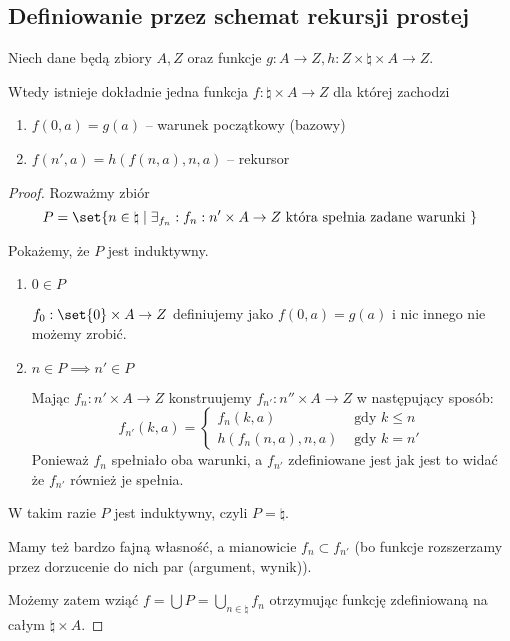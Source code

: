 \subsection{Definiowanie przez schemat rekursji prostej}

\begin{theorem}
Niech dane będą zbiory \( A, Z \) oraz funkcje \( g: A \rightarrow Z, h : Z \times \natural \times A \rightarrow Z \).

Wtedy istnieje dokładnie jedna funkcja \( f : \natural \times A \rightarrow Z \) dla której zachodzi
\begin{enumerate}
    \item \( f(0, a) = g(a) \) -- warunek początkowy (bazowy)
    \item \( f(n', a) = h(f(n, a), n, a) \) -- rekursor
\end{enumerate}
\end{theorem}
\begin{proof}
    Rozważmy zbiór 
    \[
        P = \set{ n \in \natural \mid \exists_{f_n} : f_n : n' \times A \rightarrow Z \text{ która spełnia zadane warunki }}
    \]
    
    Pokażemy, że \( P \) jest induktywny.
    
    \begin{enumerate}
        \item \( 0 \in P \)
            
            \( f_0 : \set{0} \times A \rightarrow Z \) definiujemy jako \( f(0, a) = g(a) \) i nic innego nie możemy zrobić.
            
        \item \( n \in P \implies n' \in P \)
        
            Mając \( f_n : n' \times A \rightarrow Z \) konstruujemy \( f_{n'} : n'' \times A \rightarrow Z \) w następujący sposób:
            \[
                f_{n'}(k, a) = \begin{cases}
                    f_n(k, a) & \text{ gdy } k \leq n \\
                    h(f_n(n, a), n, a) & \text{ gdy } k = n'
                \end{cases}
            \]
            Ponieważ \( f_n \) spełniało oba warunki, a \( f_{n'} \) zdefiniowane jest jak jest to widać że \( f_{n'} \) również je spełnia.
    \end{enumerate}
    
    W takim razie \( P \) jest induktywny, czyli \( P = \natural \). 
    
    Mamy też bardzo fajną własność, a mianowicie \( f_n \subset f_{n'} \) (bo funkcje rozszerzamy przez dorzucenie do nich par (argument, wynik)).
    
    Możemy zatem wziąć \( f = \bigcup P = \bigcup_{n \in \natural} f_n \) otrzymując funkcję zdefiniowaną na całym \( \natural \times A \).
\end{proof}
